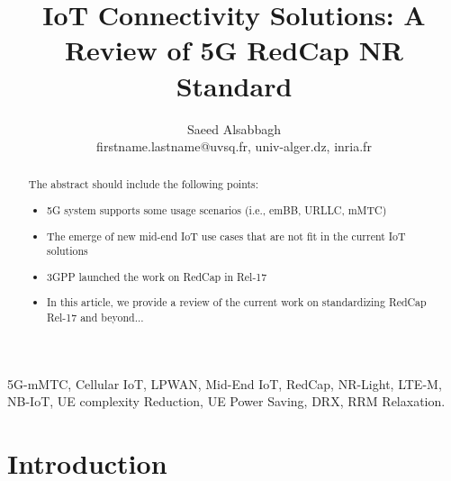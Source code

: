 \documentclass[]{IEEEtran}
\begin{document}
\title{IoT Connectivity Solutions: A Review of 5G RedCap NR Standard}


\author{Saeed Alsabbagh 


firstname.lastname@uvsq.fr, univ-alger.dz, 
inria.fr
\vspace{0mm}
}


\maketitle

\begin{abstract}
The abstract should include the following points:
\begin{itemize}
    \item   5G system supports some usage scenarios (i.e., emBB, URLLC, mMTC)
    \item   The emerge of new mid-end IoT use cases that are not fit in the current IoT solutions
    \item   3GPP launched the work on RedCap in Rel-17
    \item   In this article, we provide a review of the current work on standardizing RedCap Rel-17 and beyond...
\end{itemize}


\end{abstract}

\begin{IEEEkeywords}
5G-mMTC, Cellular IoT, LPWAN, Mid-End IoT, RedCap, NR-Light, LTE-M, NB-IoT, UE complexity Reduction, UE Power Saving, DRX, RRM Relaxation.
\end{IEEEkeywords}



\section{Introduction}
\label{sec:1-Inro}
\end{document}
